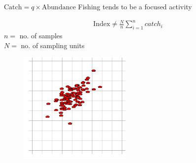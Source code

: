 \documentclass{beamer}
\begin{document}
\begin{frame}{$\text{Catch} = q \times \text{Abundance}$}
Fishing tends to be a focused activity\\
\begin{minipage}{0.4\textwidth}
  \begin{flushleft}
    \begin{align*}
      \text{Index} \neq \frac{N}{n} \sum_{i=1}^n catch_i    
    \end{align*}
    $n =$ no. of samples \\
    $N =$ no. of sampling units
  \end{flushleft}
\end{minipage}
\hspace{0.5cm}
\begin{minipage}{0.4\textwidth}
  \begin{figure}
    \centering
    \includegraphics[width=5.5cm]{fig2}
  \end{figure}
\end{minipage}
\end{frame}
\end{document}
